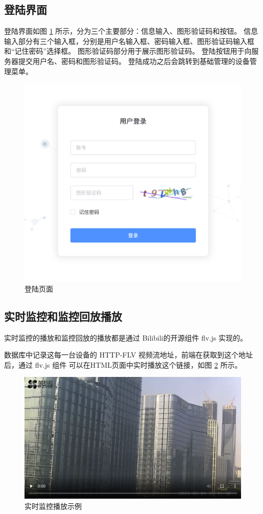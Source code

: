 \subsection{登陆界面}

登陆界面如图 \ref{Fig:login} 所示，分为三个主要部分：信息输入、图形验证码和按钮。
信息输入部分有三个输入框，分别是用户名输入框、密码输入框、图形验证码输入框和“记住密码”选择框。
图形验证码部分用于展示图形验证码。
登陆按钮用于向服务器提交用户名、密码和图形验证码。
登陆成功之后会跳转到基础管理的设备管理菜单。

\begin{figure}[ht]
    \centering
    \includegraphics[width=0.9\linewidth]{./Figure/IMG_login.png}
    \caption{登陆页面}\label{Fig:login}
\end{figure}

\newpage
\subsection{实时监控和监控回放播放}
实时监控的播放和监控回放的播放都是通过 Bilibili的开源组件 flv.js 实现的。

数据库中记录这每一台设备的 HTTP-FLV 视频流地址，前端在获取到这个地址后，通过 flv.js 组件
可以在HTML页面中实时播放这个链接，如图 \ref{Fig:record_eg} 所示。

\begin{figure}[ht]
    \centering
    \includegraphics[width=0.8\linewidth]{./Figure/IMG_record_eg.png}
    \caption{实时监控播放示例}\label{Fig:record_eg}
\end{figure}

